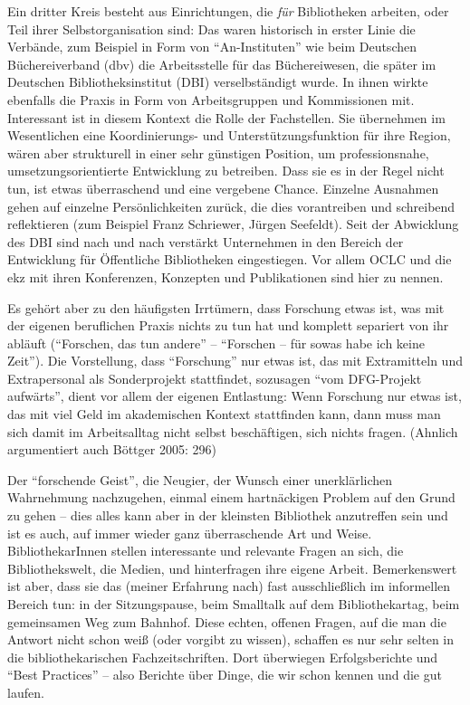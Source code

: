 \documentclass[a4paper,
fontsize=11pt,
oneside,
numbers=noperiodatend,
parskip=half-,
bibliography=totoc,
final
]{scrartcl}
\begin{document}
Ein dritter Kreis besteht aus Einrichtungen, die \emph{für} Bibliotheken
arbeiten, oder Teil ihrer Selbstorganisation sind: Das waren historisch
in erster Linie die Verbände, zum Beispiel in Form von
\enquote{An-Instituten} wie beim Deutschen Büchereiverband (dbv) die
Arbeitsstelle für das Büchereiwesen, die später im Deutschen
Bibliotheksinstitut (DBI) verselbständigt wurde. In ihnen wirkte
ebenfalls die Praxis in Form von Arbeitsgruppen und Kommissionen mit.
Interessant ist in diesem Kontext die Rolle der Fachstellen. Sie
übernehmen im Wesentlichen eine Koordinierungs- und
Unterstützungsfunktion für ihre Region, wären aber strukturell in einer
sehr günstigen Position, um professionsnahe, umsetzungsorientierte
Entwicklung zu betreiben. Dass sie es in der Regel nicht tun, ist etwas
überraschend und eine vergebene Chance. Einzelne Ausnahmen gehen auf
einzelne Persönlichkeiten zurück, die dies vorantreiben und schreibend
reflektieren (zum Beispiel Franz Schriewer, Jürgen Seefeldt). Seit der
Abwicklung des DBI sind nach und nach verstärkt Unternehmen in den
Bereich der Entwicklung für Öffentliche Bibliotheken eingestiegen. Vor
allem OCLC und die ekz mit ihren Konferenzen, Konzepten und
Publikationen sind hier zu nennen.

Es gehört aber zu den häufigsten Irrtümern, dass Forschung etwas ist,
was mit der eigenen beruflichen Praxis nichts zu tun hat und komplett
separiert von ihr abläuft (\enquote{Forschen, das tun andere} --
\enquote{Forschen -- für sowas habe ich keine Zeit}). Die Vorstellung,
dass \enquote{Forschung} nur etwas ist, das mit Extramitteln und
Extrapersonal als Sonderprojekt stattfindet, sozusagen \enquote{vom
DFG-Projekt aufwärts}, dient vor allem der eigenen Entlastung: Wenn
Forschung nur etwas ist, das mit viel Geld im akademischen Kontext
stattfinden kann, dann muss man sich damit im Arbeitsalltag nicht selbst
beschäftigen, sich nichts fragen. (Ahnlich argumentiert auch Böttger
2005: 296)

Der \enquote{forschende Geist}, die Neugier, der Wunsch einer
unerklärlichen Wahrnehmung nachzugehen, einmal einem hartnäckigen
Problem auf den Grund zu gehen -- dies alles kann aber in der kleinsten
Bibliothek anzutreffen sein und ist es auch, auf immer wieder ganz
überraschende Art und Weise. BibliothekarInnen stellen interessante und
relevante Fragen an sich, die Bibliothekswelt, die Medien, und
hinterfragen ihre eigene Arbeit. Bemerkenswert ist aber, dass sie das
(meiner Erfahrung nach) fast ausschließlich im informellen Bereich tun:
in der Sitzungspause, beim Smalltalk auf dem Bibliothekartag, beim
gemeinsamen Weg zum Bahnhof. Diese echten, offenen Fragen, auf die man
die Antwort nicht schon weiß (oder vorgibt zu wissen), schaffen es nur
sehr selten in die bibliothekarischen Fachzeitschriften. Dort überwiegen
Erfolgsberichte und \enquote{Best Practices} -- also Berichte über
Dinge, die wir schon kennen und die gut laufen.
\end{document}
